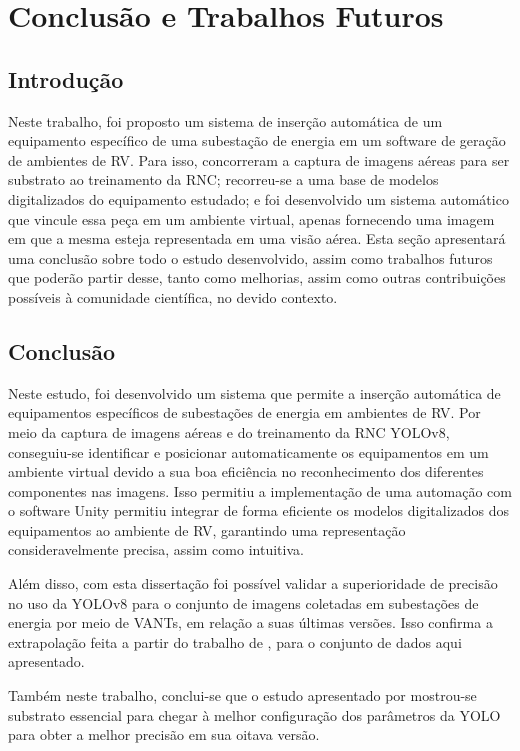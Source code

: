 \chapter{Conclusão e Trabalhos Futuros}

\section{Introdução} 

Neste trabalho, foi proposto um sistema de inserção automática de um equipamento específico de uma subestação de energia em um software de geração de ambientes de RV. Para isso, concorreram a captura de imagens aéreas para ser substrato ao treinamento da RNC; recorreu-se a uma base de modelos digitalizados do equipamento estudado; e foi desenvolvido um sistema automático que vincule essa peça em um ambiente virtual, apenas fornecendo uma imagem em que a mesma esteja representada em uma visão aérea. Esta seção apresentará uma conclusão sobre todo o estudo desenvolvido, assim como trabalhos futuros que poderão partir desse, tanto como melhorias, assim como outras contribuições possíveis à comunidade científica, no devido contexto.

\section{Conclusão} 

Neste estudo, foi desenvolvido um sistema que permite a inserção automática de equipamentos específicos de subestações de energia em ambientes de RV. Por meio da captura de imagens aéreas e do treinamento da RNC YOLOv8, conseguiu-se identificar e posicionar automaticamente os equipamentos em um ambiente virtual devido a sua boa eficiência no reconhecimento dos diferentes componentes nas imagens. Isso permitiu a implementação de uma automação com o software Unity permitiu integrar de forma eficiente os modelos digitalizados dos equipamentos ao ambiente de RV, garantindo uma representação consideravelmente precisa, assim como intuitiva.

Além disso, com esta dissertação foi possível validar a superioridade de precisão no uso da YOLOv8 para o conjunto de imagens coletadas em subestações de energia por meio de VANTs, em relação a suas últimas versões. Isso confirma a extrapolação feita a partir do trabalho de \cite{ultralytics2023yolo}, para o conjunto de dados aqui apresentado. 

Também neste trabalho, conclui-se que o estudo apresentado por \cite{gonzaga2023identificaccao} mostrou-se substrato essencial para chegar à melhor configuração dos parâmetros da YOLO para obter a melhor precisão em sua oitava versão.

